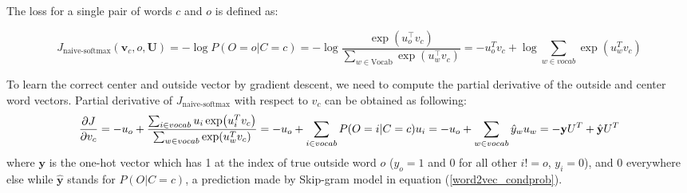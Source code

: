 \documentclass{assignment format}
\begin{document}
The loss for a single pair of words $c$ and $o$ is defined as:


\begin{equation}
 J_{\text{naive-softmax}}(\bm v_c, o, \bm U)=-\log P(O=o|C=c)= -\log\frac{\exp(u_{o}^\top v_c)}{\sum_{w \in \text{Vocab}} \exp( u_{w}^\top v_c)}=-u_o^T v_c+\log\sum_{w\in vocab}\exp(u_w^Tv_c)
\label{loss}
\end{equation}


To learn the correct center and outside vector by gradient descent, we need to compute the partial derivative of the outside and center word vectors. Partial derivative of $J_{\text{naive-softmax}}$ with respect to $v_c$ can be obtained as following:
\begin{equation}
\frac{\partial J}{\partial v_c}= -u_o+\frac{\sum_{i\in vocab} u_i\exp(u_i^Tv_c)}{\sum_{w\in vocab}\exp(u_w^Tv_c)}\\
=-u_o+\sum_{i\in vocab}P(O=i|C=c)u_i\\= -u_o+\sum_{w \in vocab}\hat{y}_wu_w\\
= -\mathbf{y}U^T+\hat{\mathbf{y}}U^T
\label{partial v_c}
\end{equation}where $\mathbf{y}$ is the one-hot vector which has 1 at the index of true outside word $o$ ($y_o=1$ and 0 for all other $i!=o$, $y_i=0$), and 0 everywhere else while $\hat{\mathbf{y}}$ stands for $P(O|C=c)$, a prediction made by Skip-gram model in equation (\ref{word2vec_condprob}).
\end{document}

